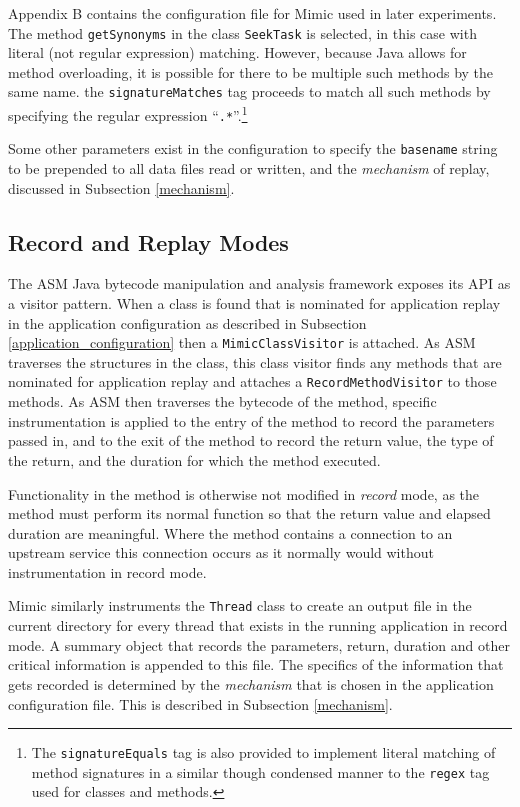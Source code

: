 \documentclass[]{final_report}
\begin{document}
Appendix B contains the configuration file for Mimic used in later experiments. The method \lstinline{getSynonyms} in the class \lstinline{SeekTask} is selected, in this case with literal (not regular expression) matching. However, because Java allows for method overloading, it is possible for there to be multiple such methods by the same name. the \lstinline{signatureMatches}\noop{} tag proceeds to match all such methods by specifying the regular expression ``\lstinline{.*}\noop{}''.\footnote{The \lstinline{signatureEquals}\noop{} tag is also provided to implement literal matching of method signatures in a similar though condensed manner to the \lstinline{regex}\noop{} tag used for classes and methods.} 

Some other parameters exist in the configuration to specify the \lstinline{basename}\noop{} string to be prepended to all data files read or written, and the \textit{mechanism} of replay, discussed in Subsection \ref{mechanism}.

\subsection{Record and Replay Modes}

The ASM Java bytecode manipulation and analysis framework exposes its API as a visitor pattern. When a class is found that is nominated for application replay in the application configuration as described in Subsection \ref{application_configuration} then a \lstinline{MimicClassVisitor}\noop{} is attached. As ASM traverses the structures in the class, this class visitor finds any methods that are nominated for application replay and attaches a \lstinline{RecordMethodVisitor}\noop{} to those methods. As ASM then traverses the bytecode of the method, specific instrumentation is applied to the entry of the method to record the parameters passed in, and to the exit of the method to record the return value, the type of the return, and the duration for which the method executed.

Functionality in the method is otherwise not modified in \textit{record} mode, as the method must perform its normal function so that the return value and elapsed duration are meaningful. Where the method contains a connection to an upstream service this connection occurs as it normally would without instrumentation in record mode.

Mimic similarly instruments the \lstinline{Thread}\noop{} class to create an output file in the current directory for every thread that exists in the running application in record mode. A summary object that records the parameters, return, duration and other critical information is appended to this file. The specifics of the information that gets recorded is determined by the \textit{mechanism} that is chosen in the application configuration file. This is described in Subsection \ref{mechanism}.
\end{document}

